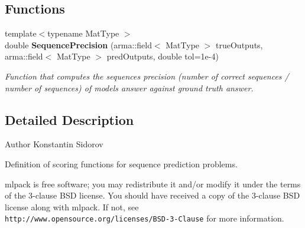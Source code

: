 \subsection*{Functions}
\begin{DoxyCompactItemize}
\item 
{\footnotesize template$<$typename Mat\+Type $>$ }\\double \textbf{ Sequence\+Precision} (arma\+::field$<$ Mat\+Type $>$ true\+Outputs, arma\+::field$<$ Mat\+Type $>$ pred\+Outputs, double tol=1e-\/4)
\begin{DoxyCompactList}\small\item\em Function that computes the sequences precision (number of correct sequences / number of sequences) of model\textquotesingle{}s answer against ground truth answer. \end{DoxyCompactList}\end{DoxyCompactItemize}


\subsection{Detailed Description}
\begin{DoxyAuthor}{Author}
Konstantin Sidorov
\end{DoxyAuthor}
Definition of scoring functions for sequence prediction problems.

mlpack is free software; you may redistribute it and/or modify it under the terms of the 3-\/clause B\+SD license. You should have received a copy of the 3-\/clause B\+SD license along with mlpack. If not, see {\tt http\+://www.\+opensource.\+org/licenses/\+B\+S\+D-\/3-\/\+Clause} for more information. 